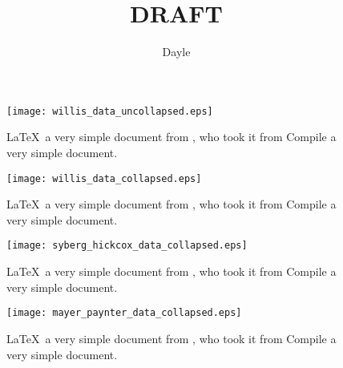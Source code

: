 \documentclass{article}
\begin{document}
\ifdraft
	\author{Dayle}
	\title{DRAFT}
	\maketitle
\else
\frontmatter
\fi

	\tableofcontents

\ifdraft
\else
\mainmatter
\fi

\pagebreak
\begin{figure}[htbp]
 \begin{center}
    \texttt{[image: willis\_data\_uncollapsed.eps]}
     \caption{\LaTeX\ a very simple document from \cite{Slater2012}, who took it from \cite{Willis1995} Compile a very simple document.}
     \label{fig:asdfasdfdf}
 \end{center}
\end{figure}

\begin{figure}[htbp]
 \begin{center}
    \texttt{[image: willis\_data\_collapsed.eps]}
     \caption{\LaTeX\ a very simple document from \cite{Slater2012}, who took it from \cite{Willis1995} Compile a very simple document.}
     \label{fig:asdfsdf}
 \end{center}
\end{figure}

\begin{figure}[htbp]
 \begin{center}
    \texttt{[image: syberg\_hickcox\_data\_collapsed.eps]}
     \caption{\LaTeX\ a very simple document from \cite{Slater2012}, who took it from \cite{Willis1995} Compile a very simple document.}
     \label{fig:asdfasdf}
 \end{center}
\end{figure}

\begin{figure}[htbp]
 \begin{center}
    \texttt{[image: mayer\_paynter\_data\_collapsed.eps]}
     \caption{\LaTeX\ a very simple document from \cite{Slater2012}, who took it from \cite{Willis1995} Compile a very simple document.}
     \label{fig:asdf}
 \end{center}
\end{figure}

\pagebreak
\ifdraft
 	\printbibliography
\else
	\backmatter
\fi
\end{document}
